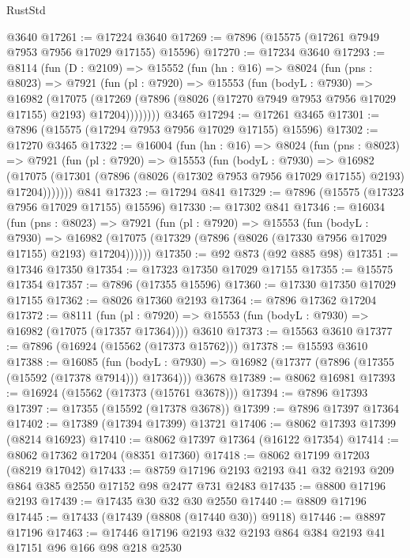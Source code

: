 \begin{lexlean}{RustStd}
\begin{coremodule}
    @3640
@17261 := @17224 @3640
@17269 := @7896 (@15575 (@17261 @7949 @7953 @7956 @17029 @17155) @15596)
@17270 := @17234 @3640
@17293 := @8114
    (fun (D : @2109) =>
    @15552
      (fun (hn : @16) =>
      @8024
        (fun (pns : @8023) =>
        @7921
          (fun (pl : @7920) =>
          @15553
            (fun (bodyL : @7930) =>
            @16982
              (@17075
                (@17269 (@7896 (@8026 (@17270 @7949 @7953 @7956 @17029 @17155) @2193) @17204))))))))
    @3465
@17294 := @17261 @3465
@17301 := @7896 (@15575 (@17294 @7953 @7956 @17029 @17155) @15596)
@17302 := @17270 @3465
@17322 := @16004
    (fun (hn : @16) =>
    @8024
      (fun (pns : @8023) =>
      @7921
        (fun (pl : @7920) =>
        @15553
          (fun (bodyL : @7930) =>
          @16982
            (@17075 (@17301 (@7896 (@8026 (@17302 @7953 @7956 @17029 @17155) @2193) @17204)))))))
    @841
@17323 := @17294 @841
@17329 := @7896 (@15575 (@17323 @7956 @17029 @17155) @15596)
@17330 := @17302 @841
@17346 := @16034
    (fun (pns : @8023) =>
    @7921
      (fun (pl : @7920) =>
      @15553
        (fun (bodyL : @7930) =>
        @16982 (@17075 (@17329 (@7896 (@8026 (@17330 @7956 @17029 @17155) @2193) @17204))))))
@17350 := @92 @873 (@92 @885 @98)
@17351 := @17346 @17350
@17354 := @17323 @17350 @17029 @17155
@17355 := @15575 @17354
@17357 := @7896 (@17355 @15596)
@17360 := @17330 @17350 @17029 @17155
@17362 := @8026 @17360 @2193
@17364 := @7896 @17362 @17204
@17372 := @8111
    (fun (pl : @7920) => @15553 (fun (bodyL : @7930) => @16982 (@17075 (@17357 @17364))))
    @3610
@17373 := @15563 @3610
@17377 := @7896 (@16924 (@15562 (@17373 @15762)))
@17378 := @15593 @3610
@17388 := @16085
    (fun (bodyL : @7930) => @16982 (@17377 (@7896 (@17355 (@15592 (@17378 @7914))) @17364)))
    @3678
@17389 := @8062 @16981
@17393 := @16924 (@15562 (@17373 (@15761 @3678)))
@17394 := @7896 @17393
@17397 := @17355 (@15592 (@17378 @3678))
@17399 := @7896 @17397 @17364
@17402 := @17389 (@17394 @17399) @13721
@17406 := @8062 @17393 @17399 (@8214 @16923)
@17410 := @8062 @17397 @17364 (@16122 @17354)
@17414 := @8062 @17362 @17204 (@8351 @17360)
@17418 := @8062 @17199 @17203 (@8219 @17042)
@17433 := @8759 @17196 @2193 @2193 @41 @32 @2193 @209 @864 @385 @2550 @17152 @98 @2477 @731 @2483
@17435 := @8800 @17196 @2193
@17439 := @17435 @30 @32 @30 @2550
@17440 := @8809 @17196
@17445 := @17433 (@17439 (@8808 (@17440 @30)) @9118)
@17446 := @8897 @17196
@17463 := @17446
    @17196
    @2193
    @32
    @2193
    @864
    @384
    @2193
    @41
    @17151
    @96
    @166
    @98
    @218
    @2530

\end{coremodule}
\end{lexlean}
